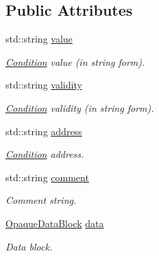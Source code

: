 \subsection*{Public Attributes}
\begin{DoxyCompactItemize}
\item 
std::string \hyperlink{class_d_d4hep_1_1_conditions_1_1_interna_1_1_condition_object_a0b82a44322c732c5f5b99123eef28f63}{value}
\begin{DoxyCompactList}\small\item\em \hyperlink{class_d_d4hep_1_1_conditions_1_1_condition}{Condition} value (in string form). \item\end{DoxyCompactList}\item 
std::string \hyperlink{class_d_d4hep_1_1_conditions_1_1_interna_1_1_condition_object_a7f4bcc75be5d565396e3f09c91a23ede}{validity}
\begin{DoxyCompactList}\small\item\em \hyperlink{class_d_d4hep_1_1_conditions_1_1_condition}{Condition} validity (in string form). \item\end{DoxyCompactList}\item 
std::string \hyperlink{class_d_d4hep_1_1_conditions_1_1_interna_1_1_condition_object_ac30708fd16161d507f475cc81419be18}{address}
\begin{DoxyCompactList}\small\item\em \hyperlink{class_d_d4hep_1_1_conditions_1_1_condition}{Condition} address. \item\end{DoxyCompactList}\item 
std::string \hyperlink{class_d_d4hep_1_1_conditions_1_1_interna_1_1_condition_object_a4bd162e79c142737fd279493329bae42}{comment}
\begin{DoxyCompactList}\small\item\em Comment string. \item\end{DoxyCompactList}\item 
\hyperlink{class_d_d4hep_1_1_opaque_data_block}{OpaqueDataBlock} \hyperlink{class_d_d4hep_1_1_conditions_1_1_interna_1_1_condition_object_a049350e2cf3f94aa39a04edd0a18a018}{data}
\begin{DoxyCompactList}\small\item\em Data block. \item\end{DoxyCompactList}\item 

\end{DoxyCompactItemize}
